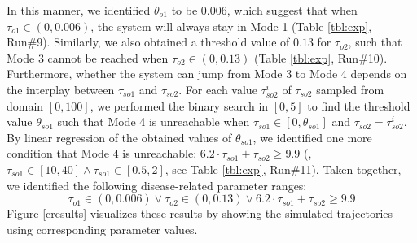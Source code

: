 In this manner, we identified $\theta_{o1}$ to be $0.006$, which suggest that when $\tau_{o1} \in (0, 0.006)$, the system will always stay in Mode 1 (Table \ref{tbl:exp}, Run\#9). Similarly, we also obtained a threshold value of $0.13$ for $\tau_{o2}$, such that Mode 3 cannot be reached when $\tau_{o2} \in (0, 0.13)$ (Table \ref{tbl:exp}, Run\#10). Furthermore, whether the system can jump from Mode 3 to Mode 4 depends on the interplay between $\tau_{so1}$ and $\tau_{so2}$.  For each value $\tau_{so2}^i$ of $\tau_{so2}$ sampled from domain $[0, 100]$, we performed the binary search in $[0, 5]$ to find the threshold value $\theta_{so1}$ such that Mode 4 is unreachable when $\tau_{so1} \in [0,\theta_{so1}]$ and $\tau_{so2} = {\tau_{so2}^i}$. By linear regression of the obtained values of $\theta_{so1}$, we identified one more condition that Mode 4 is unreachable:  $6.2 \cdot \tau_{so1} + \tau_{so2} \ge 9.9$ (\eg,  $\tau_{so1} \in [10, 40] \wedge \tau_{so1}\in [0.5, 2]$, see Table \ref{tbl:exp}, Run\#11). Taken together, we identified the following disease-related parameter ranges:
$$\tau_{o1} \in (0,0.006)\vee \tau_{o2} \in (0,0.13)\vee 6.2 \cdot \tau_{so1} + \tau_{so2} \ge 9.9$$
Figure \ref{cresults} visualizes these results by showing the simulated trajectories using corresponding parameter values.



